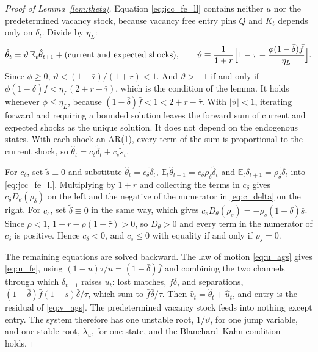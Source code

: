 \documentclass[authoryear, review, 12pt]{elsarticle}
\begin{document}
\begin{proof}[Proof of Lemma~\ref{lem:theta}]
Equation \eqref{eq:jcc_fe_ll} contains neither $u$ nor the predetermined vacancy stock,
because vacancy free entry pins $Q$ and $K_t$ depends only on $\delta_t$. Divide by $\eta_L$:
\[
	\hat\theta_t=\vartheta\,\mathbb{E}_t\hat\theta_{t+1}+\text{(current and expected shocks)},
	\qquad
	\vartheta\equiv\frac{1}{1+r}\Bigl[1-\bar\tau-\frac{\phi(1-\bar\delta)\bar{f}}{\eta_L}\Bigr].
\]
Since $\phi\geq0$, $\vartheta<(1-\bar\tau)/(1+r)<1$. And $\vartheta>-1$ if and only if
$\phi(1-\bar\delta)\bar{f}<\eta_L(2+r-\bar\tau)$, which is the condition of the lemma. It holds whenever
$\phi\leq\eta_L$, because $(1-\bar\delta)\bar{f}<1<2+r-\bar\tau$. With $|\vartheta|<1$,
iterating forward and requiring a bounded solution leaves the forward sum of current and
expected shocks as the unique solution. It does not depend on the endogenous states. With
each shock an AR(1), every term of the sum is proportional to the current shock, so
$\hat\theta_t=c_\delta\tilde\delta_t+c_s\tilde{s}_t$.

For $c_\delta$, set $\tilde{s}\equiv0$ and substitute $\hat\theta_t=c_\delta\tilde\delta_t$,
$\mathbb{E}_t\hat\theta_{t+1}=c_\delta\rho_\delta\tilde\delta_t$ and
$\mathbb{E}_t\tilde\delta_{t+1}=\rho_\delta\tilde\delta_t$ into \eqref{eq:jcc_fe_ll}. Multiplying
by $1+r$ and collecting the terms in $c_\delta$ gives $c_\delta D_\theta(\rho_\delta)$ on the
left and the negative of the numerator in \eqref{eq:c_delta} on the right. For $c_s$, set
$\tilde\delta\equiv0$ in the same way, which gives $c_sD_\theta(\rho_s)=-\rho_s(1-\bar\delta)\bar{s}$.
Since $\rho<1$, $1+r-\rho(1-\bar\tau)>0$, so $D_\theta>0$ and every term in the numerator of
$c_\delta$ is positive. Hence $c_\delta<0$, and $c_s\leq0$ with equality if and only if
$\rho_s=0$.

The remaining equations are solved backward. The law of motion \eqref{eq:u_ags} gives
\eqref{eq:u_fe}, using $(1-\bar{u})\bar\tau/\bar{u}=(1-\bar\delta)\bar{f}$ and combining the
two channels through which $\delta_{t-1}$ raises $u_t$: lost matches, $\bar{f}\bar\delta$,
and separations, $(1-\bar\delta)\bar{f}(1-\bar{s})\bar\delta/\bar\tau$, which sum to
$\bar{f}\bar\delta/\bar\tau$. Then $\hat{v}_t=\hat\theta_t+\hat{u}_t$, and entry is the
residual of \eqref{eq:v_ags}. The predetermined vacancy stock feeds into nothing except
entry. The system therefore has one unstable root, $1/\vartheta$, for one jump variable,
and one stable root, $\lambda_u$, for one state, and the Blanchard--Kahn condition holds.
\end{proof}
\end{document}
